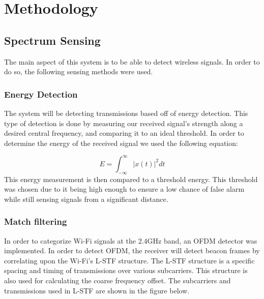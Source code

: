 \chapter{Methodology}
\section{Spectrum Sensing}
The main aspect of this system is to be able to detect wireless signals. In order to do so, the following sensing methods were used.
\subsection{Energy Detection}
The system will be detecting transmissions based off of energy detection. This type of detection is done by measuring our received signal’s strength along a desired central frequency, and comparing it to an ideal threshold. In order to determine the energy of the received signal we used the following equation:\par 
\[E = \int_{-\infty}^{\infty}| x(t) |^2dt\]
This energy measurement is then compared to a threshold energy. This threshold was chosen due to it being high enough to ensure a low chance of false alarm while still sensing signals from a significant distance. \par 


\subsection{Match filtering}
In order to categorize Wi-Fi signals at the 2.4GHz band, an OFDM detector was implemented. In order to detect OFDM, the receiver will detect beacon frames by correlating upon the Wi-Fi’s L-STF structure. The L-STF structure is a specific spacing and timing of transmissions over various subcarriers. This structure is also used for calculating the coarse frequency offset. The subcarriers and transmissions used in L-STF are shown in the figure below. \par 

